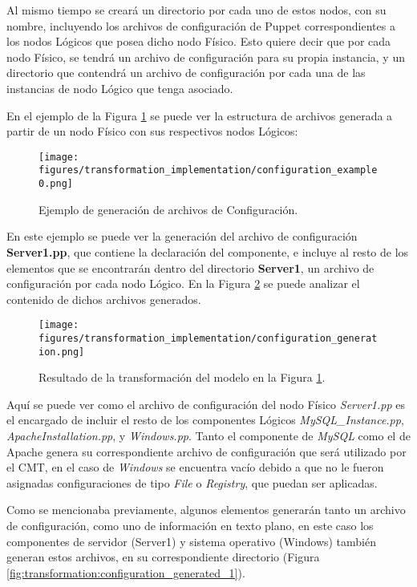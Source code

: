 Al mismo tiempo se creará un directorio por cada uno de estos nodos, con su nombre, incluyendo los archivos de configuración de Puppet correspondientes a los nodos Lógicos que posea dicho nodo Físico. Esto quiere decir que por cada nodo Físico, se tendrá un archivo de configuración para su propia instancia, y un directorio que contendrá un archivo de configuración por cada una de las instancias de nodo Lógico que tenga asociado.

En el ejemplo de la Figura \ref{fig:transformation:configuration} se puede ver la estructura de archivos generada a partir de un nodo Físico con sus respectivos nodos Lógicos:

\begin{figure}[htbp]
    \centering
    \texttt{[image: figures/transformation\_implementation/configuration\_example0.png]}
    \caption{Ejemplo de generación de archivos de Configuración.}
    \label{fig:transformation:configuration}
\end{figure}

En este ejemplo se puede ver la generación del archivo de configuración \textbf{Server1.pp}, que contiene la declaración del componente, e incluye al resto de los elementos que se encontrarán dentro del directorio \textbf{Server1}, un archivo de configuración por cada nodo Lógico. 
En la Figura \ref{fig:transformation:configuration_generated} se puede analizar el contenido de dichos archivos generados.

\begin{figure}[htbp]
    \centering
    \texttt{[image: figures/transformation\_implementation/configuration\_generation.png]}
    \caption{Resultado de la transformación del modelo en la Figura \ref{fig:transformation:configuration}.}
    \label{fig:transformation:configuration_generated}
\end{figure}

Aquí se puede ver como el archivo de configuración del nodo Físico \textit{Server1.pp} es el encargado de incluir el resto de los componentes Lógicos \textit{MySQL\_Instance.pp}, \textit{ApacheInstallation.pp}, y \textit{Windows.pp}.
Tanto el componente de \textit{MySQL} como el de Apache genera su correspondiente archivo de configuración que será utilizado por el CMT, en el caso de \textit{Windows} se encuentra vacío debido a que no le fueron asignadas configuraciones de tipo \textit{File} o \textit{Registry}, que puedan ser aplicadas.

Como se mencionaba previamente, algunos elementos generarán tanto un archivo de configuración, como uno de información en texto plano, en este caso los componentes de servidor (Server1) y sistema operativo (Windows) también generan estos archivos, en su correspondiente directorio (Figura \ref{fig:transformation:configuration_generated_1}).

